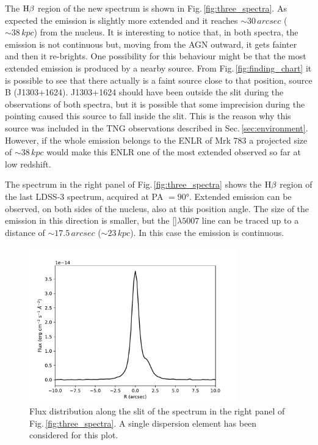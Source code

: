 \documentclass[../thesis.tex]{subfiles}
\begin{document}
The $\rm H\beta$ region of the new spectrum is shown in Fig.\,\ref{fig:three_spectra}.
As expected the emission is slightly more extended and it reaches $\sim 30\,\si{arcsec}$ ($\sim 38\,\si{kpc}$) from the nucleus.
It is interesting to notice that, in both spectra, the emission is not continuous but, moving from the AGN outward, it gets fainter and then it re-brights.
One possibility for this behaviour might be that the most extended emission is produced by a nearby source.
From Fig.\,\ref{fig:finding_chart} it is possible to see that there actually is a faint source close to that position, source B (J1303+1624).
J1303+1624 should have been outside the slit during the observations of both spectra, but it is possible that some imprecision during the pointing caused this source to fall inside the slit.
This is the reason why this source was included in the TNG observations described in Sec.\,\ref{sec:environment}.
However, if the whole emission belongs to the ENLR of Mrk 783 a projected size of $\sim 38\,\si{kpc}$ would make this ENLR one of the most extended observed so far at low redshift.

The spectrum in the right panel of Fig.\,\ref{fig:three_spectra} shows the $\rm H\beta$ region of the last LDSS-3 spectrum, acquired at PA $=\ang{90}$.
Extended emission can be observed, on both sides of the nucleus, also at this position angle.
The size of the emission in this direction is smaller, but the []$\lambda5007$ line can be traced up to a distance of $\sim 17.5\,\si{arcsec}$ ($\sim 23\,\si{kpc}$).
In this case the emission is continuous.

\begin{figure}
\centering
\includegraphics[width=0.8\textwidth]{images/paper3/Radial_distr.pdf} 
\caption[]{Flux distribution along the slit of the spectrum in the right panel of Fig.\,\ref{fig:three_spectra}. A single dispersion element has been considered for this plot.}
\label{fig:flux_distr}
\end{figure}
\end{document}
